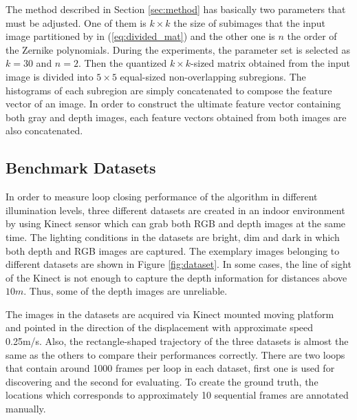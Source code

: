 \documentclass[]{spie}  %
\begin{document}
The method described in Section \ref{sec:method} has basically two parameters that must be adjusted. One of them is $k\times k$ the size of subimages that the input image partitioned by in (\ref{eq:divided_mat}) and the other one is $n$ the order of the Zernike polynomials. During the experiments, the parameter set is selected as $k=30$ and $n=2$. Then the quantized $k\times k$-sized matrix obtained from the input image is divided into $5\times 5$ equal-sized non-overlapping subregions. The histograms of each subregion are simply concatenated to compose the feature vector of an image. In order to construct the ultimate feature vector containing both gray and depth images, each feature vectors obtained from both images are also concatenated.

\subsection{Benchmark Datasets}

In order to measure loop closing performance of the algorithm in different illumination levels, three different datasets are created in an indoor environment by using Kinect sensor which can grab both RGB and depth images at the same time. The lighting conditions in the datasets are bright, dim and dark in which both depth and RGB images are captured. The exemplary images belonging to different datasets are shown in Figure \ref{fig:dataset}. In some cases, the line of sight of the Kinect is not enough to capture the depth information for distances above $10m$. Thus, some of the depth images are unreliable.

The images in the datasets are acquired via Kinect mounted moving platform and pointed in the direction of the displacement with approximate speed 0.25m/s. Also, the rectangle-shaped trajectory of the three datasets is almost the same as the others to compare their performances correctly. There are two loops that contain around 1000 frames per loop in each dataset, first one is used for discovering and the second for evaluating. To create the ground truth, the locations which corresponds to approximately 10 sequential frames are annotated manually. 
\end{document}
